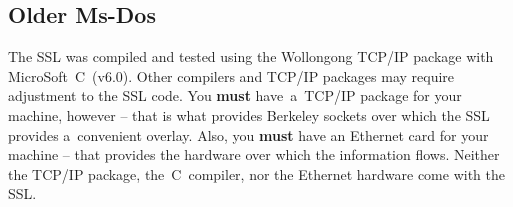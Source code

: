 \documentclass[12pt]{article}
\def\SSL{{\small SSL}}
\def\TCP{{\small TCP/IP }}
\begin{document}
\subsection{Older Ms-Dos}

The {\SSL} was compiled and tested using the Wollongong {\TCP} package with
MicroSoft~C~(v6.0).  Other compilers and {\TCP} packages may require adjustment
to the {\SSL} code.  You {\bf must} have~a~\TCP package for your machine,
however -- that is what provides Berkeley sockets over which the {\SSL} provides
a~convenient overlay.  Also, you {\bf must} have an Ethernet card for your
machine -- that provides the hardware over which the information flows.
Neither the {\TCP} package, the~C~compiler, nor the Ethernet hardware come with
the \SSL.

\begin{enumerate}


\end{enumerate}
\end{document}

